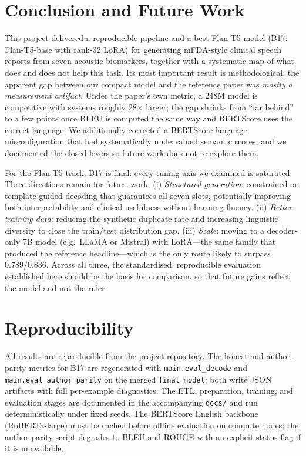 \documentclass[11pt,twocolumn]{article}
\newcommand{\bt}[1]{\texttt{#1}}
\begin{document}
\section{Conclusion and Future Work}
This project delivered a reproducible pipeline and a best Flan-T5 model (B17: Flan-T5-base with
rank-32 LoRA) for generating mFDA-style clinical speech reports from seven acoustic biomarkers,
together with a systematic map of what does and does not help this task. Its most important
result is methodological: the apparent gap between our compact model and the reference paper was
\emph{mostly a measurement artifact}. Under the paper's own metric, a 248M model is competitive
with systems roughly 28$\times$ larger; the gap shrinks from ``far behind'' to a few points once
BLEU is computed the same way and BERTScore uses the correct language. We additionally corrected a
BERTScore language misconfiguration that had systematically undervalued semantic scores, and we
documented the closed levers so future work does not re-explore them.

For the Flan-T5 track, B17 is final: every tuning axis we examined is saturated. Three directions
remain for future work. (i) \emph{Structured generation}: constrained or template-guided decoding
that guarantees all seven slots, potentially improving both interpretability and clinical
usefulness without harming fluency. (ii) \emph{Better training data}: reducing the synthetic
duplicate rate and increasing linguistic diversity to close the train/test distribution gap.
(iii) \emph{Scale}: moving to a decoder-only 7B model (e.g.\ LLaMA or Mistral) with LoRA---the
same family that produced the reference headline---which is the only route likely to surpass
0.789/0.836. Across all three, the standardised, reproducible evaluation established here should
be the basis for comparison, so that future gains reflect the model and not the ruler.

\section*{Reproducibility}
All results are reproducible from the project repository. The honest and author-parity metrics
for B17 are regenerated with \bt{main.eval\_decode} and \bt{main.eval\_author\_parity} on the
merged \bt{final\_model}; both write JSON artifacts with full per-example diagnostics. The ETL,
preparation, training, and evaluation stages are documented in the accompanying \bt{docs/} and run
deterministically under fixed seeds. The BERTScore English backbone (RoBERTa-large) must be cached
before offline evaluation on compute nodes; the author-parity script degrades to BLEU and ROUGE
with an explicit status flag if it is unavailable.
\end{document}
